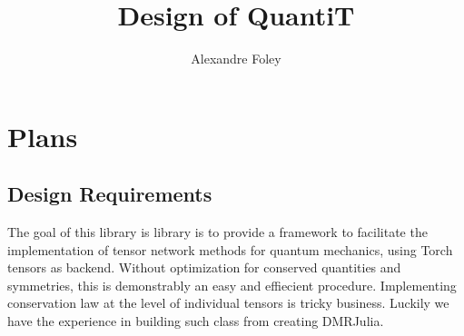 \documentclass[15pt]{book}
\begin{document}
\title{Design of QuantiT}
\author{Alexandre Foley}

\maketitle

\tableofcontents
\part{Plans}
\chapter{Design Requirements}

The goal of this library is library is to provide a framework to facilitate the implementation of tensor network methods for quantum mechanics, using Torch tensors as backend.
Without optimization for conserved quantities and symmetries, this is demonstrably an easy and effiecient procedure.
Implementing conservation law at the level of individual tensors is tricky business. Luckily we have the experience in building such class from creating DMRJulia.
\end{document}
